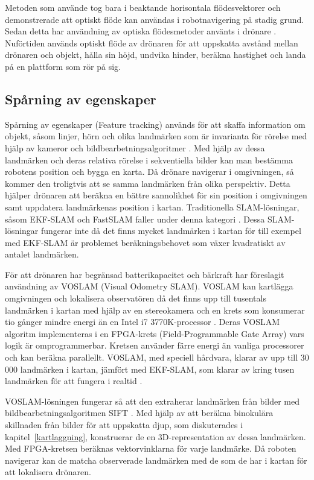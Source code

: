 Metoden som \cite{341094} använde tog bara i beaktande horisontala flödesvektorer och demonstrerade att optiskt flöde kan användas i robotnavigering på stadig grund. Sedan detta har användning av optiska flödesmetoder använts i drönare \citep{6564752}. Nuförtiden används optiskt flöde av drönaren för att uppskatta avstånd mellan drönaren och objekt, hålla sin höjd, undvika hinder, beräkna hastighet och landa på en plattform som rör på sig.

\subsection{Spårning av egenskaper}

Spårning av egenskaper (Feature tracking) används för att skaffa information om objekt, såsom linjer, hörn och olika landmärken som är invarianta för rörelse med hjälp av kameror och bildbearbetningsalgoritmer \citep{geospatial}. Med hjälp av dessa landmärken och deras relativa rörelse i sekventiella bilder kan man bestämma robotens position och bygga en karta. Då drönare navigerar i omgivningen, så kommer den troligtvis att se samma landmärken från olika perspektiv. Detta hjälper drönaren att beräkna en bättre sannolikhet för sin position i omgivningen samt uppdatera landmärkenas position i kartan. Traditionella SLAM-lösningar, såsom EKF-SLAM och FastSLAM faller under denna kategori \citep{voslamlatif}. Dessa SLAM-lösningar fungerar inte då det finns mycket landmärken i kartan för till exempel med EKF-SLAM är problemet beräkningsbehovet som växer kvadratiskt av antalet landmärken.

För att drönaren har begränsad batterikapacitet och bärkraft har \cite{voslam} föreslagit användning av VOSLAM (Visual Odometry SLAM). VOSLAM kan kartlägga omgivningen och lokalisera observatören då det finns upp till tusentals landmärken i kartan med hjälp av en stereokamera och en krets som konsumerar tio gånger mindre energi än en Intel i7 3770K-processor \citep{voslam}. Deras VOSLAM algoritm implementeras i en FPGA-krets (Field-Programmable Gate Array) vars logik är omprogrammerbar. Kretsen använder färre energi än vanliga processorer och kan beräkna parallellt. VOSLAM, med speciell hårdvara, klarar av upp till 30 000 landmärken i kartan, jämfört med EKF-SLAM, som klarar av kring tusen landmärken för att fungera i realtid \citep{ProbabilisticRobotics, voslam}.

VOSLAM-lösningen fungerar så att den extraherar landmärken från bilder med bildbearbetningsalgoritmen SIFT \citep{voslam}. Med hjälp av att beräkna binokulära skillnaden från bilder för att uppskatta djup, som diskuterades i kapitel~\ref{kartlaggning}, konstruerar de en 3D-representation av dessa landmärken. Med FPGA-kretsen beräknas vektorvinklarna för varje landmärke. Då roboten navigerar kan de matcha observerade landmärken med de som de har i kartan för att lokalisera drönaren. 

